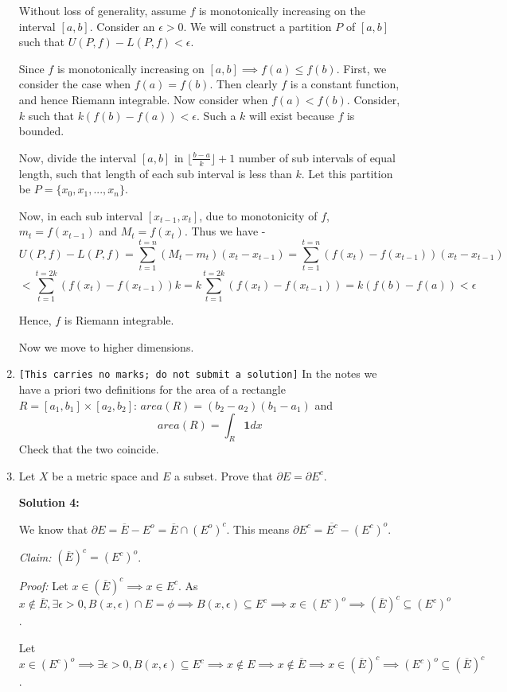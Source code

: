 \documentclass[11pt]{amsart}
\theoremstyle{definition}
\begin{document}
\begin{enumerate}[wide, labelwidth=!, labelindent=0pt]
Without loss of generality, assume $f$ is monotonically increasing on the interval $[a,b]$. Consider an $\epsilon > 0$. We will construct a partition $P$ of $[a,b]$ such that $U(P,f) - L(P,f) < \epsilon$.

Since $f$ is monotonically increasing on $[a,b] \implies f(a) \le f(b)$. First, we consider the case when $f(a) = f(b)$. Then clearly $f$ is a constant function, and hence Riemann integrable. Now consider when $f(a) < f(b)$. Consider, $k$ such that $k(f(b)-f(a)) < \epsilon$. Such a $k$ will exist because $f$ is bounded.

Now, divide the interval $[a,b]$ in $\lfloor \frac{b-a}{k} \rfloor + 1$ number of sub intervals of equal length, such that length of each sub interval is less than $k$. Let this partition be $P = \{x_0, x_1,...,x_{n}\}$.

Now, in each sub interval $[x_{t-1},x_t]$, due to monotonicity of $f$, $m_t = f(x_{t-1})$ and $M_t = f(x_t)$. Thus we have - $$U(P,f)-L(P,f) = \sum_{t=1}^{t=n} (M_t - m_t)(x_t - x_{t-1}) = \sum_{t=1}^{t=n} (f(x_t) - f(x_{t-1}))(x_t - x_{t-1})$$ $$ < \sum_{t=1}^{t=2k} (f(x_t) - f(x_{t-1}))k = k\sum_{t=1}^{t=2k} (f(x_t) - f(x_{t-1})) = k(f(b)-f(a)) < \epsilon$$

Hence, $f$ is Riemann integrable.

\newpage
Now we move to higher dimensions.

\item \texttt{[This carries no marks; do not submit a solution]} In the notes we have a priori two definitions for the area of a rectangle $R=[a_1,b_1] \times [a_2,b_2]$: $area(R)=(b_2-a_2)(b_1-a_1)$ and
$$
area(R)=\int_R \mathbf{1} dx
$$
Check that the two coincide.

\item Let $X$ be a metric space and $E$ a subset. Prove that $\partial E=\partial E^c$.

\textbf{Solution 4:}

We know that $\partial E = \overline{E}-E^o = \overline{E} \cap (E^o)^c$. This means $\partial E^c = \overline{E^c} - (E^c)^o$.

\textit{Claim:} $(\overline{E})^c = (E^c)^o$.

\textit{Proof:} Let $x\in (\overline{E})^c \implies x \in E^c$. As $x \notin \overline{E}, \exists \epsilon > 0, B(x,\epsilon) \cap E = \phi \implies B(x,\epsilon) \subseteq E^c \implies x \in (E^c)^o \implies (\overline{E})^c \subseteq (E^c)^o$.

Let $x\in (E^c)^o \implies \exists \epsilon >0, B(x,\epsilon) \subseteq E^c \implies x \notin E \implies x \notin \overline{E} \implies x \in (\overline{E})^c \implies (E^c)^o \subseteq (\overline{E})^c$.


\end{enumerate}
\end{document}
